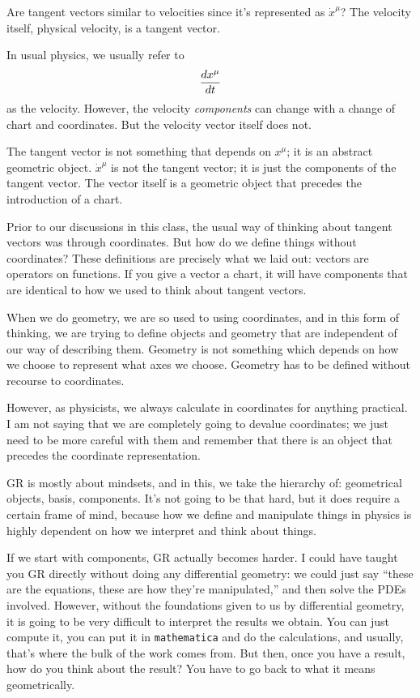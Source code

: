 		\begin{question}{Are tangent vectors similar to velocities since it's represented as $\dot{x}^\mu$?}
			The velocity itself, physical velocity, is a tangent vector.

			\hspace{1em}
			In usual physics, we usually refer to
			\[
				\dv{x^\mu}{t}
			\]
			as the velocity. However, the velocity \textit{components} can change
			with a change of chart and coordinates. But the velocity vector itself does not.

			\hspace{1em}
			The tangent vector is not something that depends on $x^\mu$; it is an
			abstract geometric object. $\dot{x}^\mu$ is not the tangent vector;
			it is just the components of the tangent vector. The vector itself is
			a geometric object that precedes the introduction of a chart.

			\hspace{1em}
			Prior to our discussions in this class, the usual way of thinking
			about tangent vectors was through coordinates. But how do we define
			things without coordinates?
			These definitions are precisely what we laid out: vectors are operators
			on functions. If you give a vector a chart, it will have components that
			are identical to how we used to think about tangent vectors.
		\end{question}

		When we do geometry, we are so used to using coordinates, and in this
		form of thinking, we are trying to define objects and geometry that are
		independent of our way of describing them. Geometry is not something
		which depends on how we choose to represent what axes we choose.
		Geometry has to be defined without recourse to coordinates.

		However, as physicists, we always calculate in coordinates for anything practical.
		I am not saying that we are completely going to devalue coordinates;
		we just need to be more careful with them and remember that there is an object
		that precedes the coordinate representation.

		GR is mostly about mindsets, and in this, we take the hierarchy of:
		geometrical objects, basis, components. It's not going to be that hard,
		but it does require a certain frame of mind, because how we define and
		manipulate things in physics is highly dependent on how we interpret and
		think about things.

		If we start with components, GR actually becomes harder. I could have taught
		you GR directly without doing any differential geometry: we could just say
		``these are the equations, these are how they're manipulated,'' and then
		solve the PDEs involved. However, without the foundations given to us by
		differential geometry, it is going to be very difficult to interpret the
		results we obtain.
		You can just compute it, you can put it in \texttt{mathematica} and do the
		calculations, and usually, that's where the bulk of the work comes from.
		But then, once you have a result, how do you think about the result?
		You have to go back to what it means geometrically.

